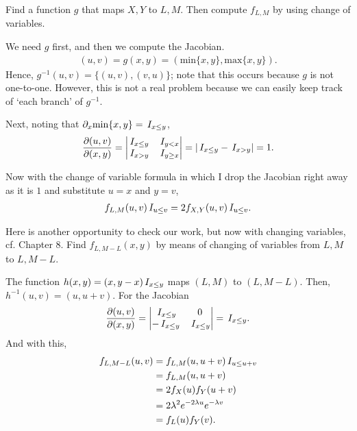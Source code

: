 \documentclass[a4paper,11pt]{article}
\renewcommand{\max}[1]{\mathrm{max}\{#1\}}
\renewcommand{\min}[1]{\mathrm{min}\{#1\}}
\begin{document}
\begin{exercise}
Find a function $g$ that maps $X,Y$ to $L,M$. Then compute $f_{L,M}$ by using change of variables.
\begin{solution}
We need $g$ first, and then we compute the Jacobian.
\begin{align}
(u,v) = g(x, y) = (\min{x,y}, \max{x,y}).
\end{align}
Hence, $g^{-1}(u,v) = \{(u,v), (v, u)\}$; note that this occurs because $g$ is not one-to-one.
However, this is not a real problem because we can easily keep track of `each branch' of $g^{-1}$.

Next, noting that $\partial_{x}\min{x,y} = \1{x\leq y}$,
\begin{align}
\frac{\partial (u,v)}{\partial(x,y)} =
  \begin{vmatrix}
    \,I_{x\leq y} & \,I_{y<x} \\
    \,I_{x > y} & \,I_{y \geq x} \\
  \end{vmatrix} = |\,I_{x\leq y} - \,I_{x>y}| = 1.
\end{align}

Now with the change of variable formula in which I drop the Jacobian right away as it is $1$ and substitute $u=x$ and $y=v$,
\begin{align}
  \label{eq:30}
f_{L,M}(u,v)\,I_{u\leq v} = 2f_{X,Y}(u,v)\,I_{u\leq v}.
\end{align}
\end{solution}
\end{exercise}



\begin{exercise}
Here is another opportunity to check our work, but now with changing variables, cf. Chapter 8.
Find $f_{L,M-L}(x,y)$ by means of changing of variables from $L,M$ to $L,M-L$.
\begin{solution}
  The function $h(x,y)= (x, y-x)\,I_{x\leq y}$ maps $(L,M)$ to $(L, M-L)$. Then, $h^{-1}(u,v) = (u, u+v)$. For the Jacobian
  \begin{align}
    \label{eq:57}
\frac{\partial (u,v)}{\partial(x,y)} =
    \begin{vmatrix}
      \,I_{x\leq y} & 0 \\
-\,I_{x\leq y} & \,I_{x\leq y}
    \end{vmatrix} = \,I_{x\leq y}.
  \end{align}
And with this,
\begin{align}
  \label{eq:19}
f_{L, M-L}(u,v)
&= f_{L, M}(u, u+v) \,I_{u\leq u+v}  \\
&= f_{L,M}(u, u+v) \\
&= 2 f_{X}(u) f_Y(u+v) \\
&= 2 \lambda^{2}e^{-2\lambda u} e^{-\lambda v} \\
&= f_{L}(u) f_Y(v).
\end{align}

\end{solution}
\end{exercise}
\end{document}
